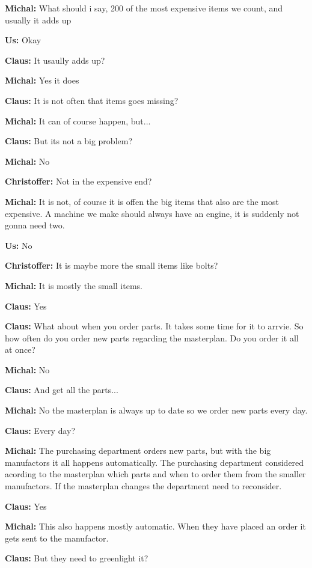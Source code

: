 
\textbf{Michal:} What should i say, 200 of the most expensive items we count,
and usually it adds up \nl

\textbf{Us:} Okay \nl

\textbf{Claus:} It usaully adds up?\nl
 
\textbf{Michal:} Yes it does\nl

\textbf{Claus:} It is not often that items goes missing?\nl

\textbf{Michal:} It can of course happen, but...\nl

\textbf{Claus:} But its not a big problem?\nl

\textbf{Michal:} No\nl

\textbf{Christoffer:} Not in the expensive end? \nl

\textbf{Michal:} It is not, of course it is offen the big items that also are
the most expensive. A machine we make should always have an engine, it is
suddenly not gonna need two.\nl

\textbf{Us:} No \nl

\textbf{Christoffer:} It is maybe more the small items like bolts?\nl

\textbf{Michal:} It is mostly the small items.\nl

\textbf{Claus:} Yes \nl

\textbf{Claus:} What about when you order parts. It takes some time for it to
arrvie. So how often do you order new parts regarding the masterplan. Do you
order it all at once?\nl

\textbf{Michal:}  No\nl

\textbf{Claus:} And get all the parts...\nl

\textbf{Michal:}  No the masterplan is always up to date so we order new parts
every day.\nl

\textbf{Claus:} Every day? \nl

\textbf{Michal:} The purchasing department orders new parts, but with the big
manufactors it all happens automatically. The purchasing department considered
acording to the masterplan which parts and when to order them from the smaller
manufactors. If the masterplan changes the department need to reconsider.\nl

\textbf{Claus:} Yes \nl

\textbf{Michal:} This also happens mostly automatic. When they have placed an
order it gets sent to the manufactor.\nl

\textbf{Claus:} But they need to greenlight it? \nl

